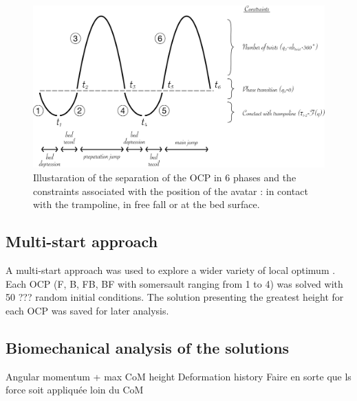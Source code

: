 \begin{figure}[h!]
\centering
\includegraphics[width=\linewidth]{figures/Model_phases.png}
\caption{Illustaration of the separation of the OCP in 6 phases and the constraints associated with the position of the avatar : in contact with the trampoline, in free fall or at the bed surface.}
\label{fig:Model_phases}
\end{figure}


\subsection{Multi-start approach}\label{subsec:2f}
A multi-start approach was used to explore a wider variety of local optimum \cite{huchez2015local}.
Each OCP (F, B, FB, BF with somersault ranging from 1 to 4) was solved with 50 ??? random initial conditions.
The solution presenting the greatest height for each OCP was saved for later analysis.


\subsection{Biomechanical analysis of the solutions}\label{subsec:2g}
Angular momentum + max CoM height
Deformation history
Faire en sorte que ls force soit appliquée loin du CoM





